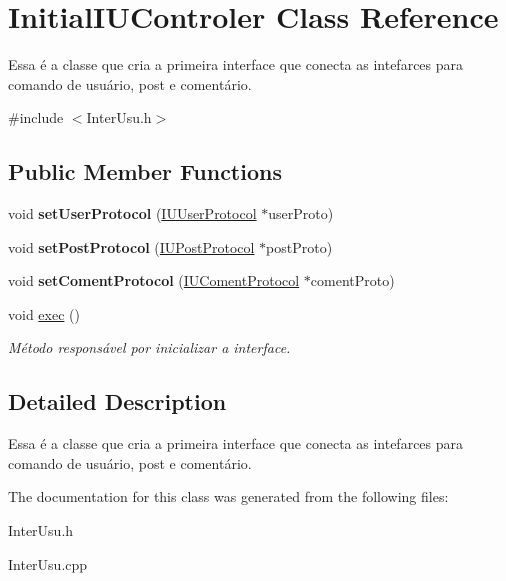 \hypertarget{class_initial_i_u_controler}{\section{Initial\-I\-U\-Controler Class Reference}
\label{class_initial_i_u_controler}
}


Essa é a classe que cria a primeira interface que conecta as intefarces para comando de usuário, post e comentário.  




{\ttfamily \#include $<$Inter\-Usu.\-h$>$}

\subsection*{Public Member Functions}
\begin{DoxyCompactItemize}
\item 
\hypertarget{class_initial_i_u_controler_a23ae82f08f995970fd8948ecd3ec5a57}{void {\bfseries set\-User\-Protocol} (\hyperlink{class_i_u_user_protocol}{I\-U\-User\-Protocol} $\ast$user\-Proto)}\label{class_initial_i_u_controler_a23ae82f08f995970fd8948ecd3ec5a57}

\item 
\hypertarget{class_initial_i_u_controler_ae296b428fcd6ff09520eac5c8bed9538}{void {\bfseries set\-Post\-Protocol} (\hyperlink{class_i_u_post_protocol}{I\-U\-Post\-Protocol} $\ast$post\-Proto)}\label{class_initial_i_u_controler_ae296b428fcd6ff09520eac5c8bed9538}

\item 
\hypertarget{class_initial_i_u_controler_a3fa667657f80bf466d503410759e393d}{void {\bfseries set\-Coment\-Protocol} (\hyperlink{class_i_u_coment_protocol}{I\-U\-Coment\-Protocol} $\ast$coment\-Proto)}\label{class_initial_i_u_controler_a3fa667657f80bf466d503410759e393d}

\item 
\hypertarget{class_initial_i_u_controler_a5eb5360ca1231f14599ea26c29c43588}{void \hyperlink{class_initial_i_u_controler_a5eb5360ca1231f14599ea26c29c43588}{exec} ()}\label{class_initial_i_u_controler_a5eb5360ca1231f14599ea26c29c43588}

\begin{DoxyCompactList}\small\item\em Método responsável por inicializar a interface. \end{DoxyCompactList}\end{DoxyCompactItemize}


\subsection{Detailed Description}
Essa é a classe que cria a primeira interface que conecta as intefarces para comando de usuário, post e comentário. 

The documentation for this class was generated from the following files\-:\begin{DoxyCompactItemize}
\item 
Inter\-Usu.\-h\item 
Inter\-Usu.\-cpp\end{DoxyCompactItemize}
